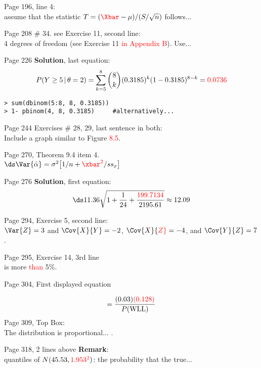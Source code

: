 \documentclass[11pt]{article}
\begin{document}
\bigskip %
Page 196, line 4:\\
assume that the statistic $T= (\textcolor{red}{\Xbar}-\mu)/(S/\sqrt{n})$ follows...

\bigskip %
Page 208 \# 34. see Exercise 11, second line:\\
4 degrees of freedom (see Exercise 11 \textcolor{red}{in Appendix B}). Use...

\bigskip %
Page 226 {\bf Solution}, last equation:\\
\[
P(Y\ge 5 \,|\, \theta=2) = \sum_{k=5}^{8}\binom{8}{k}(0.3185)^k(1-0.3185)^{8-k}
= \textcolor{red}{0.0736}
\]

\begin{verbatim}
> sum(dbinom(5:8, 8, 0.3185))
> 1- pbinom(4, 8, 0.3185)     #alternatively...
\end{verbatim}

\bigskip %
Page 244 Exercises \# 28, 29, last sentence in both: \\
Include a graph similar to Figure \textcolor{red}{8.5}.


\bigskip
Page 270, Theorem 9.4 item 4. \\
$\ds \Var{\hat{\alpha}}=
\sigma^2\bigl[1/n + {\color{red}{\xbar^2}}/ss_x\bigr]$

\bigskip
Page 276 {\bf Solution}, first equation:
\[
\ds 11.36\sqrt{1 + \frac{1}{24} + \frac{\textcolor{red}{199.7134}}{2195.61}} \approx 12.09
\]

\bigskip
Page 294, Exercise 5, second line:\\
$\Var{Z}=3$ and $\Cov{X}{Y}=-2$, $\Cov{X}{\color{red}{Z}}= -4$, and $\Cov{Y}{Z}=7$.

\bigskip
Page 295, Exercise 14, 3rd line\\
is more \textcolor{red}{than} 5\%.

\bigskip
Page 304, First displayed equation

\[
 = \frac{(0.03)\color{red}{(0.128)}}{P(\mbox{WLL})}
\]
\bigskip
Page 309, Top Box:\\
The {\color{red}{posterior}} distribution is proportional...
.

\bigskip %
Page 318, 2 lines above {\bf Remark}:\\
 quantiles of $N(45.53, \textcolor{red}{1.953^2})$: the probability that the true...
\end{document}
